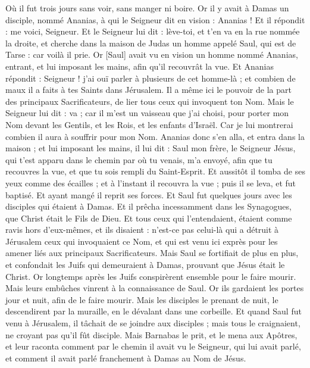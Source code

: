 \begin{multicols}{2}
Où il fut trois jours sans voir, sans manger ni boire.
Or il y avait à Damas un disciple, nommé Ananias, à qui le Seigneur dit en vision : Ananias ! Et il répondit : me voici, Seigneur.
Et le Seigneur lui dit : lève-toi, et t'en va en la rue nommée la droite, et cherche dans la maison de Judas un homme appelé Saul, qui est de Tarse : car voilà il prie.
Or [Saul] avait vu en vision un homme nommé Ananias, entrant, et lui imposant les mains, afin qu'il recouvrât la vue.
Et Ananias répondit : Seigneur ! j'ai ouï parler à plusieurs de cet homme-là ; et combien de maux il a faits à tes Saints dans Jérusalem.
Il a même ici le pouvoir de la part des principaux Sacrificateurs, de lier tous ceux qui invoquent ton Nom.
Mais le Seigneur lui dit : va ; car il m'est un vaisseau que j'ai choisi, pour porter mon Nom devant les Gentils, et les Rois, et les enfants d'Israël.
Car je lui montrerai combien il aura à souffrir pour mon Nom.
Ananias donc s'en alla, et entra dans la maison ; et lui imposant les mains, il lui dit : Saul mon frère, le Seigneur Jésus, qui t'est apparu dans le chemin par où tu venais, m'a envoyé, afin que tu recouvres la vue, et que tu sois rempli du Saint-Esprit.
Et aussitôt il tomba de ses yeux comme des écailles ; et à l'instant il recouvra la vue ; puis il se leva, et fut baptisé.
Et ayant mangé il reprit ses forces. Et Saul fut quelques jours avec les disciples qui étaient à Damas.
Et il prêcha incessamment dans les Synagogues, que Christ était le Fils de Dieu.
Et tous ceux qui l'entendaient, étaient comme ravis hors d'eux-mêmes, et ils disaient : n'est-ce pas celui-là qui a détruit à Jérusalem ceux qui invoquaient ce Nom, et qui est venu ici exprès pour les amener liés aux principaux Sacrificateurs.
Mais Saul se fortifiait de plus en plus, et confondait les Juifs qui demeuraient à Damas, prouvant que Jésus était le Christ.
Or longtemps après les Juifs conspirèrent ensemble pour le faire mourir.
Mais leurs embûches vinrent à la connaissance de Saul. Or ils gardaient les portes jour et nuit, afin de le faire mourir.
Mais les disciples le prenant de nuit, le descendirent par la muraille, en le dévalant dans une corbeille.
Et quand Saul fut venu à Jérusalem, il tâchait de se joindre aux disciples ; mais tous le craignaient, ne croyant pas qu'il fût disciple.
Mais Barnabas le prit, et le mena aux Apôtres, et leur raconta comment par le chemin il avait vu le Seigneur, qui lui avait parlé, et comment il avait parlé franchement à Damas au Nom de Jésus.

\end{multicols}
